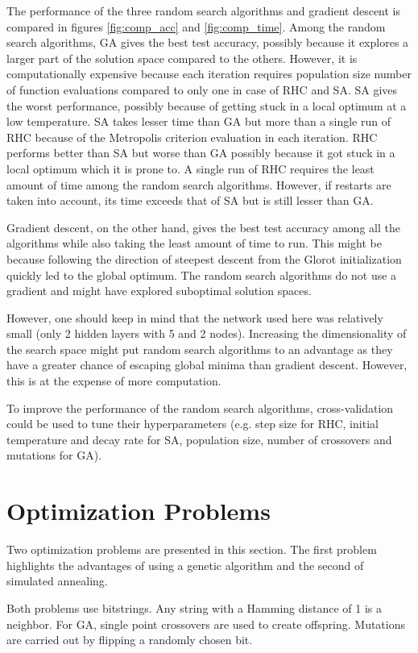 \documentclass[letterpaper]{article}
\begin{document}
	The performance of the three random search algorithms and gradient descent is compared in figures \ref{fig:comp_acc} and \ref{fig:comp_time}. Among the random search algorithms, GA gives the best test accuracy, possibly because it explores a larger part of the solution space compared to the others. However, it is computationally expensive because each iteration requires population size number of function evaluations compared to only one in case of RHC and SA. SA gives the worst performance, possibly because of getting stuck in a local optimum at a low temperature. SA takes lesser time than GA but more than a single run of RHC because of the Metropolis criterion evaluation in each iteration. RHC performs better than SA but worse than GA possibly because it got stuck in a local optimum which it is prone to. A single run of RHC requires the least amount of time among the random search algorithms. However, if restarts are taken into account, its time exceeds that of SA but is still lesser than GA.
	
	Gradient descent, on the other hand, gives the best test accuracy among all the algorithms while also taking the least amount of time to run. This might be because following the direction of steepest descent from the Glorot initialization quickly led to the global optimum. The random search algorithms do not use a gradient and might have explored suboptimal solution spaces.
	
	However, one should keep in mind that the network used here was relatively small (only 2 hidden layers with 5 and 2 nodes). Increasing the dimensionality of the search space might put random search algorithms to an advantage as they have a greater chance of escaping global minima than gradient descent. However, this is at the expense of more computation.
	
	To improve the performance of the random search algorithms, cross-validation could be used to tune their hyperparameters (e.g. step size for RHC, initial temperature and decay rate for SA, population size, number of crossovers and mutations for GA).
	
	\section{Optimization Problems}
	Two optimization problems are presented in this section. The first problem highlights the advantages of using a genetic algorithm and the second of simulated annealing.
	
	Both problems use bitstrings. Any string with a Hamming distance of 1 is a neighbor. For GA, single point crossovers are used to create offspring. Mutations are carried out by flipping a randomly chosen bit.
	
\end{document}
